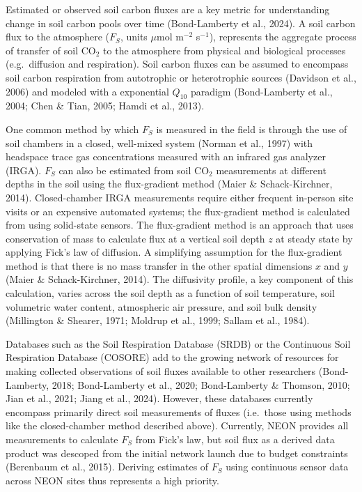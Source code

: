 \documentclass[
  letterpaper,
  DIV=11,
  numbers=noendperiod]{scrartcl}
\begin{document}
Estimated or observed soil carbon fluxes are a key metric for
understanding change in soil carbon pools over time (Bond-Lamberty et
al., 2024). A soil carbon flux to the atmosphere (\(F_{S}\), units
\(\mu\)mol m\(^{-2}\) s\(^{-1}\)), represents the aggregate process of
transfer of soil CO\(_{2}\) to the atmosphere from physical and
biological processes (e.g.~diffusion and respiration). Soil carbon
fluxes can be assumed to encompass soil carbon respiration from
autotrophic or heterotrophic sources (Davidson et al., 2006) and modeled
with a exponential \(Q_{10}\) paradigm (Bond-Lamberty et al., 2004; Chen
\& Tian, 2005; Hamdi et al., 2013).

One common method by which \(F_{S}\) is measured in the field is through
the use of soil chambers in a closed, well-mixed system (Norman et al.,
1997) with headspace trace gas concentrations measured with an infrared
gas analyzer (IRGA). \(F_{S}\) can also be estimated from soil
CO\(_{2}\) measurements at different depths in the soil using the
flux-gradient method (Maier \& Schack-Kirchner, 2014). Closed-chamber
IRGA measurements require either frequent in-person site visits or an
expensive automated systems; the flux-gradient method is calculated from
using solid-state sensors. The flux-gradient method is an approach that
uses conservation of mass to calculate flux at a vertical soil depth
\(z\) at steady state by applying Fick's law of diffusion. A simplifying
assumption for the flux-gradient method is that there is no mass
transfer in the other spatial dimensions \(x\) and \(y\) (Maier \&
Schack-Kirchner, 2014). The diffusivity profile, a key component of this
calculation, varies across the soil depth as a function of soil
temperature, soil volumetric water content, atmospheric air pressure,
and soil bulk density (Millington \& Shearer, 1971; Moldrup et al.,
1999; Sallam et al., 1984).

Databases such as the Soil Respiration Database (SRDB) or the Continuous
Soil Respiration Database (COSORE) add to the growing network of
resources for making collected observations of soil fluxes available to
other researchers (Bond-Lamberty, 2018; Bond-Lamberty et al., 2020;
Bond-Lamberty \& Thomson, 2010; Jian et al., 2021; Jiang et al., 2024).
However, these databases currently encompass primarily direct soil
measurements of fluxes (i.e.~those using methods like the closed-chamber
method described above). Currently, NEON provides all measurements to
calculate \(F_{S}\) from Fick's law, but soil flux as a derived data
product was descoped from the initial network launch due to budget
constraints (Berenbaum et al., 2015). Deriving estimates of \(F_{S}\)
using continuous sensor data across NEON sites thus represents a high
priority.
\end{document}
